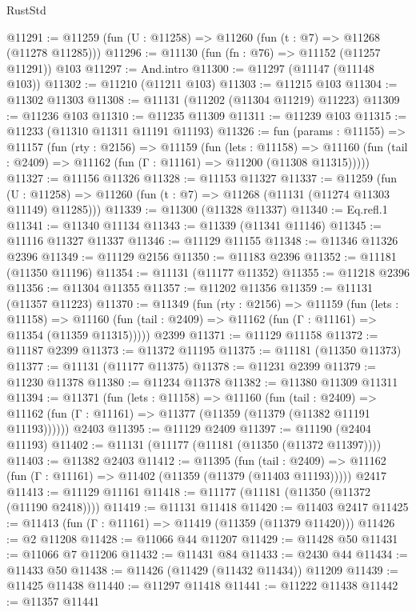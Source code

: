 \begin{lexlean}{RustStd}
\begin{coremodule}
@11291 := @11259 (fun (U : @11258) => @11260 (fun (t : @7) => @11268 (@11278 @11285)))
@11296 := @11130 (fun (fn : @76) => @11152 (@11257 @11291)) @103
@11297 := And.intro
@11300 := @11297 (@11147 (@11148 @103))
@11302 := @11210 (@11211 @103)
@11303 := @11215 @103
@11304 := @11302 @11303
@11308 := @11131 (@11202 (@11304 @11219) @11223)
@11309 := @11236 @103
@11310 := @11235 @11309
@11311 := @11239 @103
@11315 := @11233 (@11310 @11311 @11191 @11193)
@11326 := fun (params : @11155) =>
  @11157
    (fun (rty : @2156) =>
    @11159
      (fun (lets : @11158) =>
      @11160 (fun (tail : @2409) => @11162 (fun (Γ : @11161) => @11200 (@11308 @11315)))))
@11327 := @11156 @11326
@11328 := @11153 @11327
@11337 := @11259
    (fun (U : @11258) => @11260 (fun (t : @7) => @11268 (@11131 (@11274 @11303 @11149) @11285)))
@11339 := @11300 (@11328 @11337)
@11340 := Eq.refl.{1}
@11341 := @11340 @11134
@11343 := @11339 (@11341 @11146)
@11345 := @11116 @11327 @11337
@11346 := @11129 @11155
@11348 := @11346 @11326 @2396
@11349 := @11129 @2156
@11350 := @11183 @2396
@11352 := @11181 (@11350 @11196)
@11354 := @11131 (@11177 @11352)
@11355 := @11218 @2396
@11356 := @11304 @11355
@11357 := @11202 @11356
@11359 := @11131 (@11357 @11223)
@11370 := @11349
    (fun (rty : @2156) =>
    @11159
      (fun (lets : @11158) =>
      @11160 (fun (tail : @2409) => @11162 (fun (Γ : @11161) => @11354 (@11359 @11315)))))
    @2399
@11371 := @11129 @11158
@11372 := @11187 @2399
@11373 := @11372 @11195
@11375 := @11181 (@11350 @11373)
@11377 := @11131 (@11177 @11375)
@11378 := @11231 @2399
@11379 := @11230 @11378
@11380 := @11234 @11378
@11382 := @11380 @11309 @11311
@11394 := @11371
    (fun (lets : @11158) =>
    @11160
      (fun (tail : @2409) =>
      @11162 (fun (Γ : @11161) => @11377 (@11359 (@11379 (@11382 @11191 @11193))))))
    @2403
@11395 := @11129 @2409
@11397 := @11190 (@2404 @11193)
@11402 := @11131 (@11177 (@11181 (@11350 (@11372 @11397))))
@11403 := @11382 @2403
@11412 := @11395
    (fun (tail : @2409) => @11162 (fun (Γ : @11161) => @11402 (@11359 (@11379 (@11403 @11193)))))
    @2417
@11413 := @11129 @11161
@11418 := @11177 (@11181 (@11350 (@11372 (@11190 @2418))))
@11419 := @11131 @11418
@11420 := @11403 @2417
@11425 := @11413 (fun (Γ : @11161) => @11419 (@11359 (@11379 @11420)))
@11426 := @2 @11208
@11428 := @11066 @44 @11207
@11429 := @11428 @50
@11431 := @11066 @7 @11206
@11432 := @11431 @84
@11433 := @2430 @44
@11434 := @11433 @50
@11438 := @11426 (@11429 (@11432 @11434)) @11209
@11439 := @11425 @11438
@11440 := @11297 @11418
@11441 := @11222 @11438
@11442 := @11357 @11441

\end{coremodule}
\end{lexlean}
